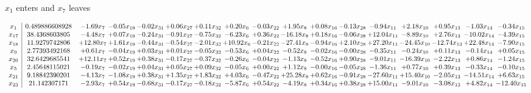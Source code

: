 \documentclass[9pt]{article}
\begin{document}
 $ x_{1} $ enters and $ x_{7} $ leaves 

 \[\begin{array}{c| c c@{\hskip 2pt} c@{\hskip 2pt} c@{\hskip 2pt} c@{\hskip 2pt} c@{\hskip 2pt} c@{\hskip 2pt} c@{\hskip 2pt} c@{\hskip 2pt} c@{\hskip 2pt} c@{\hskip 2pt} c@{\hskip 2pt} c@{\hskip 2pt} c@{\hskip 2pt} c@{\hskip 2pt} c@{\hskip 2pt} }
 x_{1}   &  0.489886608928 & -1.69 x_{7} & -0.05 x_{19} & -0.02 x_{31} & +  0.06 x_{27} & +  0.11 x_{32} & +  0.20 x_{6} & -0.03 x_{22} & +  1.95 x_{8} & +  0.08 x_{16} & -0.13 x_{28} & -0.94 x_{11} & +  2.18 x_{10} & +  0.95 x_{13} & -1.03 x_{14} & -0.34 x_{15}\\
 x_{17}   &  38.4368603805 & -4.48 x_{7} & +  0.07 x_{19} & -0.24 x_{31} & -0.91 x_{27} & -0.75 x_{32} & -6.23 x_{6} & +  0.36 x_{22} & -16.18 x_{8} & +  0.18 x_{16} & -0.06 x_{28} & + 12.04 x_{11} & -8.89 x_{10} & +  2.76 x_{13} & -10.02 x_{14} & -4.39 x_{15}\\
 x_{18}   &  11.9279742806 & + 12.80 x_{7} & +  1.61 x_{19} & -0.44 x_{31} & -0.54 x_{27} & -2.01 x_{32} & + 10.92 x_{6} & -0.21 x_{22} & -27.41 x_{8} & -0.94 x_{16} & +  2.10 x_{28} & + 27.20 x_{11} & -24.45 x_{10} & -12.74 x_{13} & + 22.48 x_{14} & -7.90 x_{15}\\
 x_{9}   &  2.77393492168 & +  0.61 x_{7} & -0.04 x_{19} & +  0.03 x_{31} & +  0.01 x_{27} & -0.05 x_{32} & -0.53 x_{6} & +  0.04 x_{22} & -0.52 x_{8} & -0.02 x_{16} & -0.00 x_{28} & -0.35 x_{11} & -0.24 x_{10} & +  0.11 x_{13} & -0.14 x_{14} & +  0.05 x_{15}\\
 x_{20}   &  32.6429685541 & + 12.11 x_{7} & +  0.52 x_{19} & +  0.38 x_{31} & -0.17 x_{27} & -0.37 x_{32} & -0.26 x_{6} & -0.04 x_{22} & -1.13 x_{8} & -0.52 x_{16} & +  0.90 x_{28} & -9.01 x_{11} & -16.39 x_{10} & -2.22 x_{13} & +  0.86 x_{14} & -1.24 x_{15}\\
 x_{5}   &  2.45648115021 & -0.19 x_{7} & -0.02 x_{19} & +  0.04 x_{31} & +  0.05 x_{27} & +  0.09 x_{32} & -0.05 x_{6} & +  0.00 x_{22} & +  1.12 x_{8} & -0.00 x_{16} & -0.05 x_{28} & -1.36 x_{11} & +  0.77 x_{10} & +  0.39 x_{13} & -0.33 x_{14} & -0.10 x_{15}\\
 x_{21}   &  9.18842390201 & -4.13 x_{7} & -1.08 x_{19} & +  0.38 x_{31} & +  1.35 x_{27} & +  1.83 x_{32} & +  4.03 x_{6} & -0.47 x_{22} & + 25.28 x_{8} & +  0.62 x_{16} & -0.91 x_{28} & -27.60 x_{11} & + 15.40 x_{10} & -2.05 x_{13} & -14.51 x_{14} & +  6.63 x_{15}\\
 x_{23}   &  21.142307171 & -2.93 x_{7} & +  0.54 x_{19} & -0.68 x_{31} & -0.17 x_{27} & -0.18 x_{32} & -5.87 x_{6} & +  0.54 x_{22} & -4.19 x_{8} & +  0.34 x_{16} & +  0.38 x_{28} & + 15.00 x_{11} & -9.01 x_{10} & -3.08 x_{13} & +  4.82 x_{14} & -12.40 x_{15}\\

\end{array}\]
\end{document}
